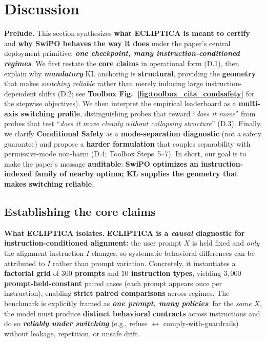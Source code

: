 \section{Discussion}
\label{sec:discussion}

\vspace{-0.35em}
\noindent\textbf{Prelude.}
This section synthesizes \textbf{what ECLIPTICA is meant to certify} and \textbf{why SwiPO behaves the way it does} under the paper's central deployment primitive: \textbf{\emph{one checkpoint, many instruction-conditioned regimes}}. We first restate the \textbf{core claims} in operational form (D.1), then explain why \textbf{\emph{mandatory}} KL anchoring is \textbf{structural}, providing the \textbf{geometry} that makes \emph{switching reliable} rather than merely inducing large instruction-dependent shifts (D.2; see \textbf{Toolbox Fig.~\ref{fig:toolbox_cita_condsafety}} for the stepwise objectives). We then interpret the empirical leaderboard as a \textbf{multi-axis switching profile}, distinguishing probes that reward ``\emph{does it move}'' from probes that test ``\emph{does it move cleanly without collapsing structure}'' (D.3). Finally, we clarify \textbf{Conditional Safety} as a \textbf{mode-separation diagnostic} (not a safety guarantee) and propose a \textbf{harder formulation} that couples separability with permissive-mode non-harm (D.4; Toolbox Steps~5--7). In short, our goal is to make the paper's message \textbf{auditable}: \textbf{SwiPO optimizes an instruction-indexed family of nearby optima; KL supplies the geometry that makes switching reliable.}

\vspace{-0.35em}
\subsection{Establishing the core claims}
\vspace{-0.2em}

\noindent\textbf{What ECLIPTICA isolates.}
\textbf{ECLIPTICA is a \emph{causal} diagnostic for instruction-conditioned alignment:} the user prompt $X$ is held fixed and \emph{only} the alignment instruction $I$ changes, so systematic behavioral differences can be attributed to $I$ rather than prompt variation. Concretely, it instantiates a \textbf{factorial grid} of \textbf{$300$ prompts} and \textbf{$10$ instruction types}, yielding \textbf{$3{,}000$ prompt-held-constant} paired cases (each prompt appears once per instruction), enabling \textbf{strict paired comparisons} across regimes. The benchmark is explicitly framed as \textbf{\emph{one prompt, many policies}}: for the \emph{same} $X$, the model must produce \textbf{distinct behavioral contracts} across instructions and do so \textbf{\emph{reliably under switching}} (e.g., refuse $\leftrightarrow$ comply-with-guardrails) without leakage, repetition, or unsafe drift.

